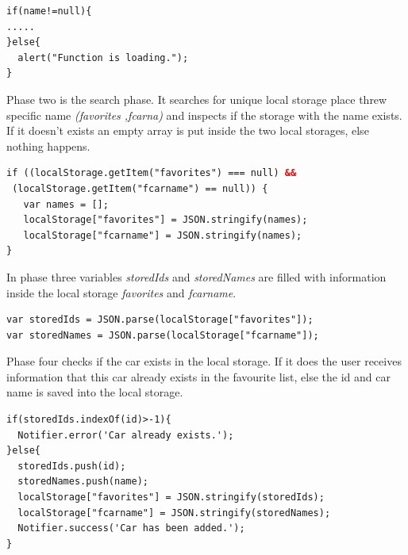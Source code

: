 \begin{lstlisting}[language=html, caption= 
Phase one,captionpos=b]
if(name!=null){
.....
}else{
  alert("Function is loading.");
}
\end{lstlisting}

Phase two is the search phase. It searches for unique local storage place threw specific name \textit{(favorites ,fcarna)} and inspects if the storage with the name exists. If it doesn't exists an empty array is put inside the two local storages, else nothing happens.
\\

\begin{lstlisting}[language=html, caption= 
Phase two,captionpos=b]
if ((localStorage.getItem("favorites") === null) &&
 (localStorage.getItem("fcarname") == null)) {
   var names = [];
   localStorage["favorites"] = JSON.stringify(names);	
   localStorage["fcarname"] = JSON.stringify(names);
}
\end{lstlisting}


In phase three variables \textit{storedIds} and \textit{storedNames} are filled with information inside the local storage \textit{favorites} and \textit{fcarname}.
\\

\begin{lstlisting}[language=html, caption= 
Phase three,captionpos=b]
var storedIds = JSON.parse(localStorage["favorites"]);
var storedNames = JSON.parse(localStorage["fcarname"]);
\end{lstlisting}
\newpage
Phase four checks if the car exists in the local storage. If it does the user receives information that this car already exists in the favourite list, else the id and car name is saved into the local storage.
\\

\begin{lstlisting}[language=html, caption= 
Phase four,captionpos=b]
if(storedIds.indexOf(id)>-1){
  Notifier.error('Car already exists.');
}else{
  storedIds.push(id);
  storedNames.push(name);
  localStorage["favorites"] = JSON.stringify(storedIds);
  localStorage["fcarname"] = JSON.stringify(storedNames);
  Notifier.success('Car has been added.');
}
\end{lstlisting}

